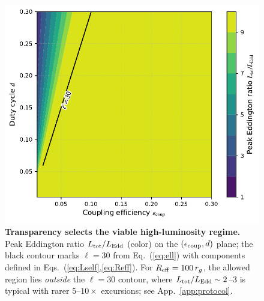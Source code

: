 \documentclass[twocolumn]{aastex701}
\newcommand{\ellcrit}{30}
\begin{document}
\begingroup
\setlength{\textfloatsep}{6pt plus 2pt minus 2pt} %
\begin{figure}[tp!]
  \centering
  \includegraphics[width=0.95\columnwidth,trim=0 6 0 4,clip]{fig10a_Reff100.pdf}
  \vspace{-2pt}
  \caption{\textbf{Transparency selects the viable high-luminosity regime.}
  Peak Eddington ratio $L_{\rm tot}/L_{\rm Edd}$ (color) on the $(\epsilon_{\rm coup},d)$ plane; the black contour marks $\ell{=}\ellcrit$ from Eq.~(\ref{eq:ell})
  with components defined in Eqs.~(\ref{eq:Lself},\ref{eq:Reff}). For $R_{\rm eff}=100\,r_g$, the allowed region lies \emph{outside} the $\ell{=}\ellcrit$ contour, where
  $L_{\rm tot}/L_{\rm Edd}\sim2$--$3$ is typical with rarer $5$--$10\times$ excursions; see App.~\ref{app:protocol}.}
  \label{fig:param-a}
\end{figure}
\endgroup
\end{document}
